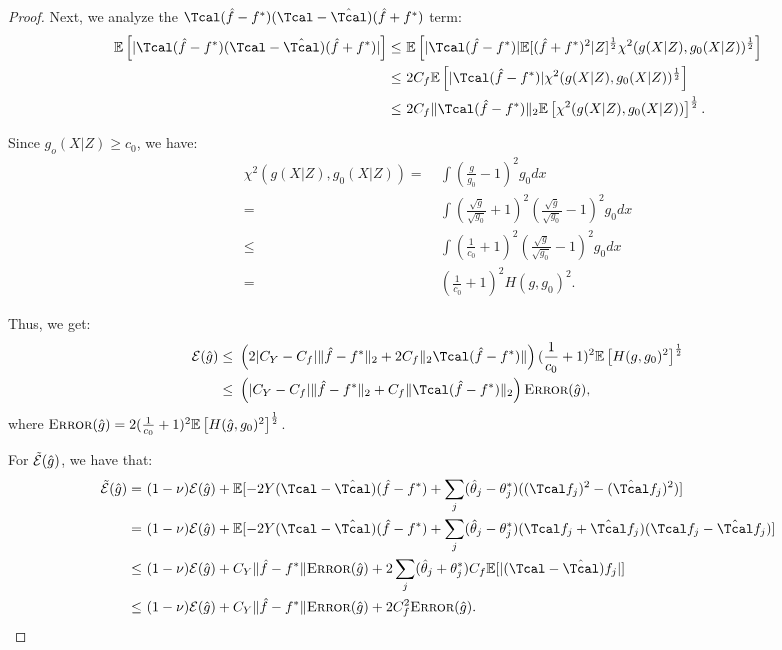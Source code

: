 \documentclass[12pt]{extarticle} %
\newcommand{\E}{\mathbb{E}}
\newcommand{\error}{\ensuremath{\textsc{Error}}}
\begin{document}
\begin{proof}
Next, we analyze the $\Tcal(\hat{f}-f^*)(\Tcal-\hat{\Tcal})(\hat{f}+f^*)$ term:
\begin{align*}
    \mathbb{E}\left[| \Tcal(\hat{f}-f^*)(\Tcal-\hat{\Tcal})(\hat{f}+f^*)|\right] \leq~& 
    \mathbb{E}\left[|\Tcal(\hat{f}-f^*)|\mathbb{E}[(\hat{f}+f^*)^2|Z]^{\frac{1}{2}}\mathcal{\chi}^2(g(X|Z),g_0(X|Z))^{\frac{1}{2}}\right]\\
    \leq~& 2C_f\mathbb{E}\left[|\Tcal(\hat{f}-f^*)|\mathcal{\chi}^2(g(X|Z),g_0(X|Z))^{\frac{1}{2}}\right]\\
    \leq~&2C_f\|\Tcal(\hat{f}-f^*)\|_2\mathbb{E}\left[\mathcal{\chi}^2(g(X|Z),g_0(X|Z))\right]^{\frac{1}{2}}.
\end{align*}

Since $g_o(X|Z)\geq c_0$, we have:
\begin{align*}
    \mathcal{\chi}^2(g(X|Z),g_0(X|Z)) =~&\int\left(\frac{g}{g_0}-1\right)^2g_0dx\\
    =~&\int\left(\frac{\sqrt{g}}{\sqrt{g_0}}+1\right)^2\left(\frac{\sqrt{g}}{\sqrt{g_0}}-1\right)^2g_0dx\\
    \leq~&\int\left(\frac{1}{c_0}+1\right)^2\left(\frac{\sqrt{g}}{\sqrt{g_0}}-1\right)^2g_0dx\\
    =~&\left(\frac{1}{c_0}+1\right)^2 H(g,g_0)^2.
\end{align*}

Thus, we get:
\begin{align*}
    {\cal E}(\hat{g}) \leq~& \left(2|C_Y-C_f|\|\hat{f}-f^*\|_{2}+2C_f\|_2\Tcal(\hat{f}-f^*)\|\right)(\frac{1}{c_0} + 1)^2\mathbb{E}\left[H(g,g_0)^2\right]^{\frac{1}{2}}\\
    \leq~& \left(|C_Y-C_f|\|\hat{f}-f^*\|_{2}+C_f\|\Tcal(\hat{f}-f^*)\|_2\right)\error(\hat{g}),
\end{align*} where $\error(\hat{g}) =2(\frac{1}{c_0} + 1)^2\mathbb{E}\left[H(\hat{g},g_0)^2\right]^{\frac{1}{2}}$.

For $\tilde{\cal E}(\hat{g})$, we have that:
\begin{align*}
    \tilde{\cal E}(\hat{g}) =~& (1-\nu){\cal E}(\hat{g})+\E[-2Y(\Tcal -\hat{\Tcal})(\hat{f}-f^*) + \sum_{j} (\hat{\theta}_j-\theta_j^*)((\Tcal f_j)^2 -(\hat{\Tcal}f_j)^2)]\\
    = ~& (1-\nu){\cal E}(\hat{g}) +\E[-2Y(\Tcal -\hat{\Tcal})(\hat{f}-f^*) + \sum_j (\hat{\theta}_j-\theta_j^*)( \Tcal f_j +\hat{\Tcal}f_j)(\Tcal f_j -\hat{\Tcal}f_j)]\\
    \leq~&  (1-\nu){\cal E}(\hat{g}) + C_Y \|\hat{f}-f^*\|\error(\hat{g}) + 2\sum_j (\hat{\theta}_j+\theta_j^*) C_f\E[|(\Tcal-\hat{\Tcal})f_j|]\\
    \leq~& (1-\nu){\cal E}(\hat{g}) + C_Y \|\hat{f}-f^*\|\error(\hat{g}) + 2 C_f^2\error(\hat{g}).
\end{align*}

\end{proof}
\end{document}
